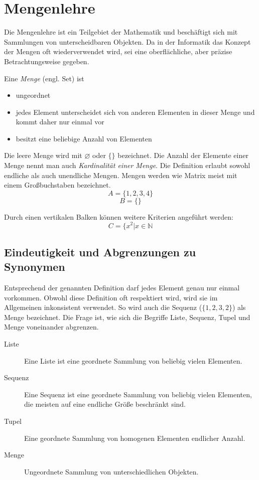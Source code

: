 \chapter{Mengenlehre}
%
Die Mengenlehre ist ein Teilgebiet der Mathematik und beschäftigt sich mit Sammlungen von unterscheidbaren Objekten. Da in der Informatik das Konzept der Mengen oft wiederverwendet wird, sei eine oberflächliche, aber präzise Betrachtungsweise gegeben.

Eine \emph{Menge} (engl. Set) ist
\begin{itemize}
 \item ungeordnet
 \item jedes Element unterscheidet sich von anderen Elementen in dieser Menge und kommt daher nur einmal vor
 \item besitzt eine beliebige Anzahl von Elementen
\end{itemize}
%
Die leere Menge wird mit $\diameter$ oder $\{\}$ bezeichnet. Die Anzahl der Elemente einer Menge nennt man auch \emph{Kardinalität einer Menge}. Die Definition erlaubt sowohl endliche als auch unendliche Mengen. Mengen werden wie Matrix meist mit einem Großbuchstaben bezeichnet.
%
\[
   A = \{1, 2, 3, 4\}
\] \[
   B = \{\}
\]

Durch einen vertikalen Balken können weitere Kriterien angeführt werden:
%
\[
  C = \{x^2 | x \in \mathbb{N}
\]

\section{Eindeutigkeit und Abgrenzungen zu Synonymen}

Entsprechend der genannten Definition darf jedes Element genau nur einmal vorkommen. Obwohl diese Definition oft respektiert wird, wird sie im Allgemeinen inkonsistent verwendet. So wird auch die Sequenz ($\{1, 2, 3, 2\}$) als Menge bezeichnet. Die Frage ist, wie sich die Begriffe Liste, Sequenz, Tupel und Menge voneinander abgrenzen.

\begin{description}
 \item[Liste] Eine Liste ist eine geordnete Sammlung von beliebig vielen Elementen.
 \item[Sequenz] Eine Sequenz ist eine geordnete Sammlung von beliebig vielen Elementen,
                die meisten auf eine endliche Größe beschränkt sind.
 \item[Tupel] Eine geordnete Sammlung von homogenen Elementen endlicher Anzahl.
 \item[Menge] Ungeordnete Sammlung von unterschiedlichen Objekten.
\end{description}

